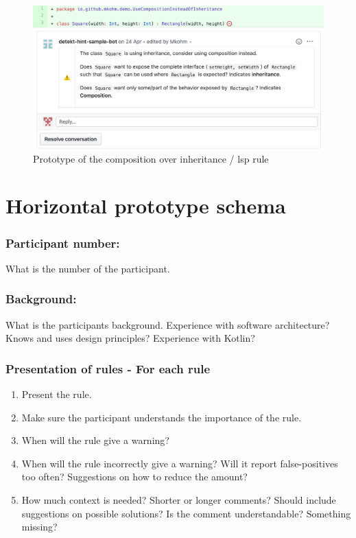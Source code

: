 \begin{figure}[h!]
    \centering
    \includegraphics[width=\textwidth]{images/horizontal-prototype-coh.png}
    \caption{Prototype of the composition over inheritance / \gls{lsp} rule}
    \label{fig:liskov}
\end{figure}

\clearpage

\section{Horizontal prototype schema}
\label{semi-structured-interview-schema}
\subsubsection*{Participant number:} What is the number of the participant.
\subsubsection*{Background:} What is the participants background. Experience with software architecture? Knows and uses design principles? Experience with Kotlin?
\subsubsection*{Presentation of rules - For each rule}
\begin{enumerate}
    \item Present the rule. 
    \item Make sure the participant understands the importance of the rule.
    \item When will the rule give a warning?
    \item When will the rule incorrectly give a warning? Will it report false-positives too often? Suggestions on how to reduce the amount?
    \item How much context is needed? Shorter or longer comments? Should include suggestions on possible solutions? Is the comment understandable? Something missing?
\end{enumerate}

